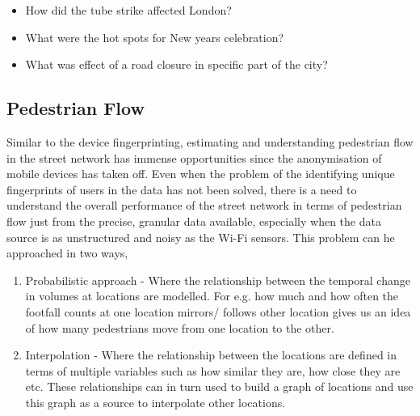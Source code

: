 
\begin{itemize}
  \setlength{\itemindent}{2em}
  \itemsep-0.25em
  \item How did the tube strike affected London?
  \item What were the hot spots for New years celebration?
  \item What was effect of a road closure in specific part of the city?
\end{itemize}

\subsection{Pedestrian Flow}

Similar to the device fingerprinting, estimating and understanding pedestrian flow in the street network has immense opportunities since the anonymisation of mobile devices has taken off.
Even when the problem of the identifying unique fingerprints of users in the data has not been solved, there is a need to understand the overall performance of the street network in terms of pedestrian flow just from the precise, granular data available, especially when the data source is as unstructured and noisy as the Wi-Fi sensors.
This problem can he approached in two ways,


\begin{enumerate}
  \itemsep-0.25em
  \item Probabilistic approach - Where the relationship between the temporal change in volumes at locations are modelled.
  For e.g. how much and how often the footfall counts at one location mirrors/ follows other location gives us an idea of how many pedestrians move from one location to the other.
  \item Interpolation - Where the relationship between the locations are defined in terms of multiple variables such as how similar they are, how close they are etc.
  These relationships can in turn used to build a graph of locations and use this graph as a source to interpolate other locations.
\end{enumerate}

